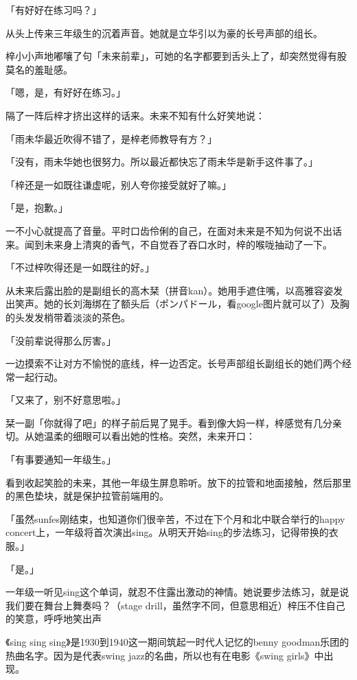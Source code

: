 \documentclass[UTF8]{ctexart}
\begin{document}
    「有好好在练习吗？」

    从头上传来三年级生的沉着声音。她就是立华引以为豪的长号声部的组长。

    梓小小声地嘟嚷了句「未来前辈」，可她的名字都要到舌头上了，却突然觉得有股莫名的羞耻感。

    「嗯，是，有好好在练习。」

    隔了一阵后梓才挤出这样的话来。未来不知有什么好笑地说：

    「雨未华最近吹得不错了，是梓老师教导有方？」

    「没有，雨未华她也很努力。所以最近都快忘了雨未华是新手这件事了。」

    「梓还是一如既往谦虚呢，别人夸你接受就好了嘛。」

    「是，抱歉。」

    一不小心就提高了音量。平时口齿伶俐的自己，在面对未来是不知为何说不出话来。闻到未来身上清爽的香气，不自觉吞了吞口水时，梓的喉咙抽动了一下。

    「不过梓吹得还是一如既往的好。」

    从未来后露出脸的是副组长的高木栞（拼音kan）。她用手遮住嘴，以高雅容姿发出笑声。她的长刘海绑在了额头后（ポンパドール，看google图片就可以了）及胸的头发发梢带着淡淡的茶色。

    「没前辈说得那么厉害。」

    一边摸索不让对方不愉悦的底线，梓一边否定。长号声部组长副组长的她们两个经常一起行动。

    「又来了，别不好意思啦。」

    栞一副「你就得了吧」的样子前后晃了晃手。看到像大妈一样，梓感觉有几分亲切。从她温柔的细眼可以看出她的性格。突然，未来开口：

    「有事要通知一年级生。」

    看到收起笑脸的未来，其他一年级生屏息聆听。放下的拉管和地面接触，然后那里的黑色垫块，就是保护拉管前端用的。

    「虽然sunfes刚结束，也知道你们很辛苦，不过在下个月和北中联合举行的happy concert上，一年级将首次演出sing。从明天开始sing的步法练习，记得带换的衣服。」

    「是。」

    一年级一听见sing这个单词，就忍不住露出激动的神情。她说要步法练习，就是说我们要在舞台上舞奏吗？（stage drill，虽然字不同，但意思相近）梓压不住自己的笑意，呼呼地笑出声

    《sing sing sing》是1930到1940这一期间筑起一时代人记忆的benny goodman乐团的热曲名字。因为是代表swing jazz的名曲，所以也有在电影《swing girls》中出现。
\end{document}
